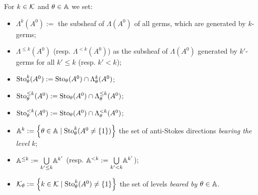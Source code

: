 \begin{notations}
  For $k\in\mathcal{K}$ and $\theta\in\mathbb{A}$ we set:
  \begin{itemize}
    \item $\Lambda^{k}(A^0):=$ the subsheaf of $\Lambda(A^0)$ of all germs,
      which are generated by $k$-germs;
    \item $\Lambda^{\leq k}(A^0)$ (resp. $\Lambda^{<k}(A^0)$) as the subsheaf
      of $\Lambda(A^0)$ generated by $k'$-germs for all $k'\leq k$ (resp.
      $k'<k$);
    \item $\operatorname{Sto}_\theta^k(A^0):=\operatorname{Sto}_\theta(A^0)\cap\Lambda_\theta^{k}(A^0)$;
    \item $\operatorname{Sto}_\theta^{\leq k}(A^0):=\operatorname{Sto}_\theta(A^0)\cap\Lambda_\theta^{\leq k}(A^0)$;
    \item $\operatorname{Sto}_\theta^{<k}(A^0):=\operatorname{Sto}_\theta(A^0)\cap\Lambda_\theta^{<k}(A^0)$;
    \item $\mathbb{A}^k:=\left\{\theta\in\mathbb{A}\mid\operatorname{Sto}_\theta^k(A^0\neq\{1\})\right\}$ the
      set of anti-Stokes directions \emph{bearing the level $k$};
    \item $\mathbb{A}^{\leq k}:=\underset{k'\leq k}\bigcup\mathbb{A}^{k'}$ (resp.
      $\mathbb{A}^{<k}:=\underset{k'<k}\bigcup\mathbb{A}^{k'}$);
    \item $\mathcal{K}_\theta:=\left\{k\in\mathcal{K}\mid\operatorname{Sto}_\theta^k(A^0)\neq\{1\}\right\}$
      the set of levels \emph{beared by $\theta\in\mathbb{A}$}.
  \end{itemize}
\end{notations}

